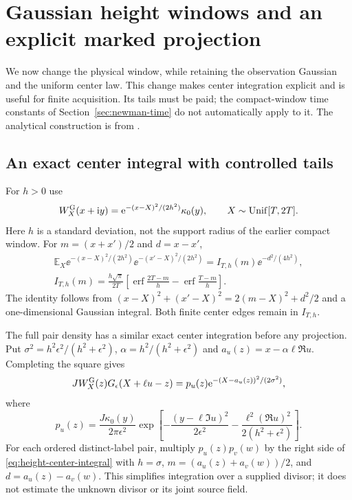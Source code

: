\section{Gaussian height windows and an explicit marked projection}\label{sec:gaussian-window}

We now change the physical window, while retaining the observation
Gaussian and the uniform center law. This change makes center integration
explicit and is useful for finite acquisition. Its tails must be paid;
the compact-window time constants of Section~\ref{sec:newman-time}
do not automatically apply to it. The analytical construction is from
\cite{OCGaussianWindow,OCProjection}.

\subsection{An exact center integral with controlled tails}

For $h>0$ use
\begin{equation}\label{eq:gaussian-height-window}
 W_X^{\rm G}(x+\mathrm i y)=\mathrm e^{-(x-X)^2/(2h^2)}\kappa_0(y),
 \qquad X\sim\operatorname{Unif}[T,2T].
\end{equation}
Here $h$ is a standard deviation, not the support radius of the earlier
compact window. For $m=(x+x')/2$ and $d=x-x'$,
\begin{equation}\label{eq:height-center-integral}
 \begin{gathered}
 \mathbb E_X\ee^{-(x-X)^2/(2h^2)}\ee^{-(x'-X)^2/(2h^2)}
   =I_{T,h}(m)\ee^{-d^2/(4h^2)},\\
 I_{T,h}(m)=\frac{h\sqrt\pi}{2T}
 \left[\operatorname{erf}\frac{2T-m}{h}
                    -\operatorname{erf}\frac{T-m}{h}\right].
 \end{gathered}
\end{equation}
The identity follows from
$(x-X)^2+(x'-X)^2=2(m-X)^2+d^2/2$ and a one-dimensional Gaussian integral.
Both finite center edges remain in $I_{T,h}$.

The full pair density has a similar exact center integration before
any projection. Put
$\sigma^2=h^2\epsilon^2/(h^2+\epsilon^2)$,
$\alpha=h^2/(h^2+\epsilon^2)$ and
$a_u(z)=x-\alpha\ell\Re u$. Completing the square gives
\[
 JW_X^{\rm G}(z)G_\epsilon(X+\ell u-z)
  =p_u(z)\mathrm e^{-(X-a_u(z))^2/(2\sigma^2)},
\]
where
\[
 p_u(z)=\frac{J\kappa_0(y)}{2\pi\epsilon^2}
  \exp\left[-\frac{(y-\ell\Im u)^2}{2\epsilon^2}
             -\frac{\ell^2(\Re u)^2}{2(h^2+\epsilon^2)}\right].
\]
For each ordered distinct-label pair, multiply $p_u(z)p_v(w)$ by
the right side of \eqref{eq:height-center-integral} with $h=\sigma$,
$m=(a_u(z)+a_v(w))/2$, and $d=a_u(z)-a_v(w)$.
This simplifies integration over a supplied divisor; it does not
estimate the unknown divisor or its joint source field.

